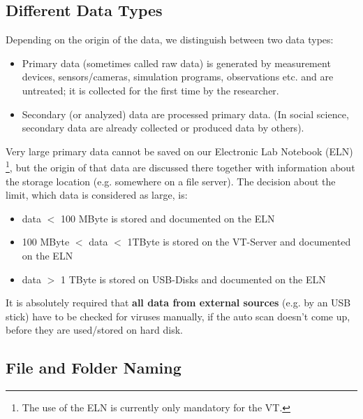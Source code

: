 \subsection{Different Data Types}
Depending on the origin of the data, we distinguish between two data types:
\begin{itemize}
  \item Primary data (sometimes called raw data) is generated by measurement
        devices, sensors/cameras, simulation programs, observations etc. and
        are untreated; it is collected for the first time by the researcher.
  \item Secondary (or analyzed) data are processed primary data. (In social
        science, secondary data are already collected or produced data by
        others).
\end{itemize}
Very large primary data cannot be saved on our Electronic Lab Notebook (ELN)%
\footnote{The use of the ELN is currently only
mandatory for the VT. },
but the origin of that data are discussed there together with information about
the storage location (e.g. somewhere on a file server). The decision about the
limit, which data is considered as large, is:
\begin{itemize}
  \item data $<$ 100 MByte is stored and documented on the ELN
  \item 100 MByte  $<$ data $<$ 1TByte is stored on the VT-Server and documented
        on the ELN
  \item data $>$ 1 TByte is stored on USB-Disks and documented on the ELN
\end{itemize}
It is absolutely required that \textbf{all data from external sources} (e.g. by an USB
stick) have to be checked for viruses manually, if the auto scan doesn’t come
up, before they are used/stored on hard disk.

\subsection{File and Folder Naming}

